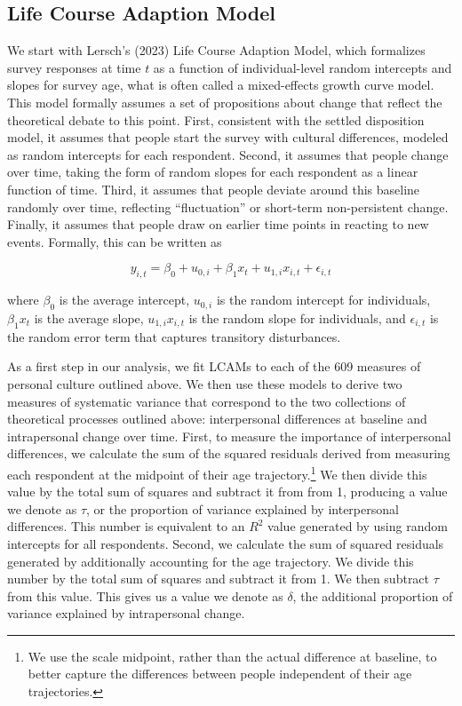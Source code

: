 \documentclass[
  11pt,
]{article}
\begin{document}
\hypertarget{life-course-adaption-model}{%
\subsection{Life Course Adaption
Model}\label{life-course-adaption-model}}

We start with Lersch's (2023) Life Course Adaption Model, which
formalizes survey responses at time \(t\) as a function of
individual-level random intercepts and slopes for survey age, what is
often called a mixed-effects growth curve model. This model formally
assumes a set of propositions about change that reflect the theoretical
debate to this point. First, consistent with the settled disposition
model, it assumes that people start the survey with cultural
differences, modeled as random intercepts for each respondent. Second,
it assumes that people change over time, taking the form of random
slopes for each respondent as a linear function of time. Third, it
assumes that people deviate around this baseline randomly over time,
reflecting ``fluctuation'' or short-term non-persistent change. Finally,
it assumes that people draw on earlier time points in reacting to new
events. Formally, this can be written as

\[
y_{i, t} = \beta_0 + u_{0, i} + \beta_1 x_t + u_{1, i} x_{i, t} + \epsilon_{i, t}
\]

where \(\beta_0\) is the average intercept, \(u_{0, i}\) is the random
intercept for individuals, \(\beta_1 x_t\) is the average slope,
\(u_{1, i} x_{i, t}\) is the random slope for individuals, and
\(\epsilon_{i, t}\) is the random error term that captures transitory
disturbances.

As a first step in our analysis, we fit LCAMs to each of the 609
measures of personal culture outlined above. We then use these models to
derive two measures of systematic variance that correspond to the two
collections of theoretical processes outlined above: interpersonal
differences at baseline and intrapersonal change over time. First, to
measure the importance of interpersonal differences, we calculate the
sum of the squared residuals derived from measuring each respondent at
the midpoint of their age trajectory.\footnote{We use the scale
  midpoint, rather than the actual difference at baseline, to better
  capture the differences between people independent of their age
  trajectories.} We then divide this value by the total sum of squares
and subtract it from from 1, producing a value we denote as \(\tau\), or
the proportion of variance explained by interpersonal differences. This
number is equivalent to an \(R^2\) value generated by using random
intercepts for all respondents. Second, we calculate the sum of squared
residuals generated by additionally accounting for the age trajectory.
We divide this number by the total sum of squares and subtract it from
1. We then subtract \(\tau\) from this value. This gives us a value we
denote as \(\delta\), the additional proportion of variance explained by
intrapersonal change.
\end{document}
